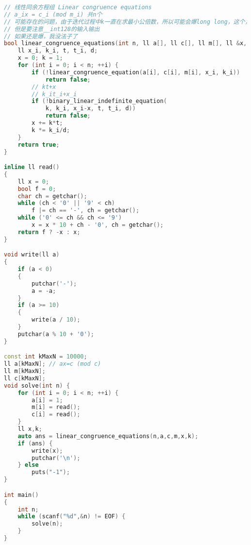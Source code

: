 \begin{lstlisting}[language={c++}]
// 线性同余方程组 Linear congruence equations
// a_ix = c_i (mod m_i) 共n个
// 可能存在的问题，由于迭代过程中k一直在求最小公倍数，所以可能会爆long long，这个，最佳的方法是直接暴力把ll的定义改为__int128
// 但是要注意__int128的输入输出
// 如果还是爆，我没法子了
bool linear_congruence_equations(int n, ll a[], ll c[], ll m[], ll &x, ll &k) {
	ll x_i, k_i, t, t_i, d;
	x = 0; k = 1;
	for (int i = 0; i < n; ++i) {
		if (!linear_congruence_equation(a[i], c[i], m[i], x_i, k_i))
			return false; 
		// kt+x
		// k_it_i+x_i
		if (!binary_linear_indefinite_equation(
			k, k_i, x_i-x, t, t_i, d))
			return false;
		x += k*t;
		k *= k_i/d;
	}
	return true;
}

inline ll read()
{
	ll x = 0;
	bool f = 0;
	char ch = getchar();
	while (ch < '0' || '9' < ch)
		f |= ch == '-', ch = getchar();
	while ('0' <= ch && ch <= '9')
		x = x * 10 + ch - '0', ch = getchar();
	return f ? -x : x;
}

void write(ll a)
{
	if (a < 0)
	{
		putchar('-');
		a = -a;
	}
	if (a >= 10)
	{
		write(a / 10);
	}
	putchar(a % 10 + '0');
}

const int kMaxN = 10000;
ll a[kMaxN]; // ax=c (mod c)
ll m[kMaxN];
ll c[kMaxN]; 
void solve(int n) {
	for (int i = 0; i < n; ++i) {
		a[i] = 1;
		m[i] = read();
		c[i] = read();
	}
	ll x,k;
	auto ans = linear_congruence_equations(n,a,c,m,x,k);
	if (ans) {
		write(x);
		putchar('\n');
	} else
		puts("-1");
}

int main()
{
	int n;
	while (scanf("%d",&n) != EOF) {
		solve(n);
	}
}
		\end{lstlisting}